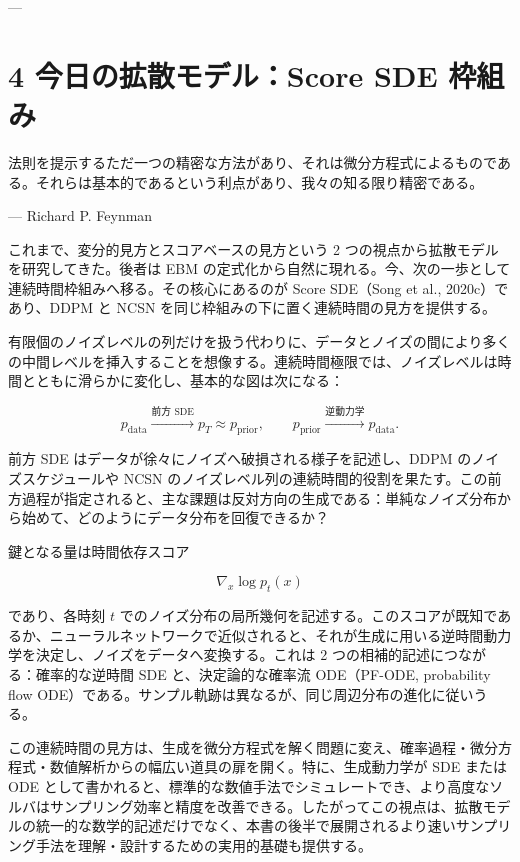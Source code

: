 ---

\section*{4 今日の拡散モデル：Score SDE 枠組み}


\begin{propositionbox}[注意]
法則を提示するただ一つの精密な方法があり、それは微分方程式によるものである。それらは基本的であるという利点があり、我々の知る限り精密である。

— Richard P. Feynman
\end{propositionbox}


これまで、変分的見方とスコアベースの見方という 2 つの視点から拡散モデルを研究してきた。後者は EBM の定式化から自然に現れる。今、次の一歩として連続時間枠組みへ移る。その核心にあるのが Score SDE（Song et al., 2020c）であり、DDPM と NCSN を同じ枠組みの下に置く連続時間の見方を提供する。

有限個のノイズレベルの列だけを扱う代わりに、データとノイズの間により多くの中間レベルを挿入することを想像する。連続時間極限では、ノイズレベルは時間とともに滑らかに変化し、基本的な図は次になる：

\[
p_{\mathrm{data}}\xrightarrow{\text{前方 SDE}} p_T\approx p_{\mathrm{prior}},
\qquad
p_{\mathrm{prior}}\xrightarrow{\text{逆動力学}} p_{\mathrm{data}}.
\]


前方 SDE はデータが徐々にノイズへ破損される様子を記述し、DDPM のノイズスケジュールや NCSN のノイズレベル列の連続時間的役割を果たす。この前方過程が指定されると、主な課題は反対方向の生成である：単純なノイズ分布から始めて、どのようにデータ分布を回復できるか？

鍵となる量は時間依存スコア

\[
\nabla_x\log p_t(x)
\]


であり、各時刻 $t$ でのノイズ分布の局所幾何を記述する。このスコアが既知であるか、ニューラルネットワークで近似されると、それが生成に用いる逆時間動力学を決定し、ノイズをデータへ変換する。これは 2 つの相補的記述につながる：確率的な逆時間 SDE と、決定論的な確率流 ODE（PF-ODE, probability flow ODE）である。サンプル軌跡は異なるが、同じ周辺分布の進化に従いうる。

この連続時間の見方は、生成を微分方程式を解く問題に変え、確率過程・微分方程式・数値解析からの幅広い道具の扉を開く。特に、生成動力学が SDE または ODE として書かれると、標準的な数値手法でシミュレートでき、より高度なソルバはサンプリング効率と精度を改善できる。したがってこの視点は、拡散モデルの統一的な数学的記述だけでなく、本書の後半で展開されるより速いサンプリング手法を理解・設計するための実用的基礎も提供する。


